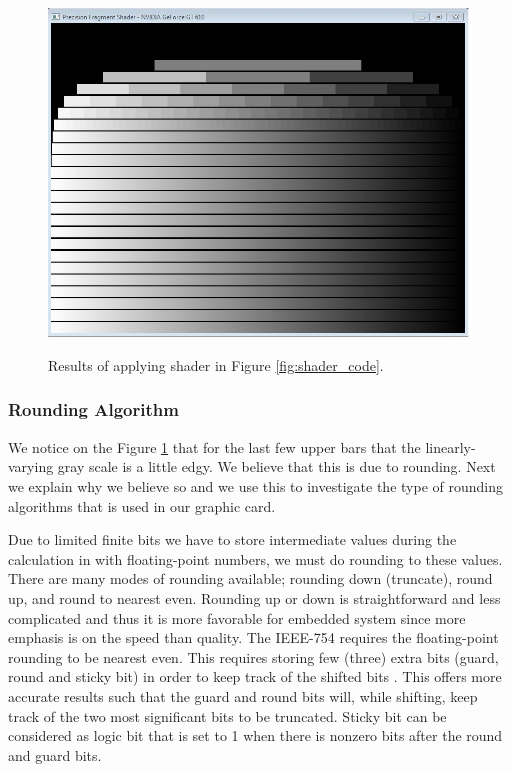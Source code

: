 \begin{figure}[t!]
 \centering   
    {\includegraphics[width=\linewidth]{fig/shader_gt610.JPG}} 
  \caption{Results of applying shader in Figure \ref{fig:shader_code}.}
   \label{fig:shader_fig}
\end{figure} 

\subsubsection{Rounding Algorithm}
We notice on the Figure \ref{fig:shader_fig} that for the last few upper bars that the linearly-varying gray scale is a little edgy. We believe that this is due to rounding. Next we explain why we believe so and we use this to investigate the type of rounding algorithms that is used in our graphic card.

Due to limited finite bits we have to store intermediate values during the calculation in with floating-point numbers, we must do rounding to these values. There are many modes of rounding available; rounding down (truncate), round up, and round to nearest even. Rounding up or down is straightforward and less complicated and thus it is more favorable for embedded system since more emphasis is on the speed than quality.  The IEEE-754 requires the floating-point rounding to be nearest even. This requires storing few (three) extra bits (guard, round and sticky bit) in order to keep track of the shifted bits \cite{patterson2013computer}. This offers more accurate results such that the guard and round bits will, while shifting, keep track of the two most significant bits to be truncated. Sticky bit can be considered as logic bit that is set to 1 when there is nonzero bits after the round and guard bits. 

